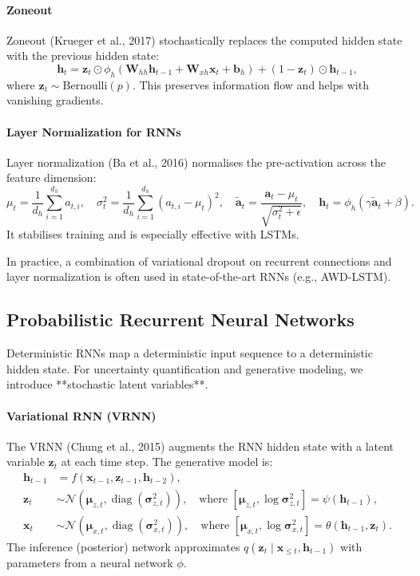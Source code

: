 \documentclass{tufte-handout}
\begin{document}
\paragraph{Zoneout}
Zoneout (Krueger et al., 2017) stochastically replaces the computed hidden state with the previous hidden state:
\[
\mathbf{h}_t = \mathbf{z}_t \odot \phi_h(\mathbf{W}_{hh}\mathbf{h}_{t-1} + \mathbf{W}_{xh}\mathbf{x}_t + \mathbf{b}_h) + (1 - \mathbf{z}_t) \odot \mathbf{h}_{t-1},
\]
where $\mathbf{z}_t \sim \text{Bernoulli}(p)$. This preserves information flow and helps with vanishing gradients.

\paragraph{Layer Normalization for RNNs}
Layer normalization (Ba et al., 2016) normalises the pre-activation across the feature dimension:
\[
\mu_t = \frac{1}{d_h}\sum_{i=1}^{d_h} a_{t,i},\quad \sigma_t^2 = \frac{1}{d_h}\sum_{i=1}^{d_h} (a_{t,i} - \mu_t)^2,\quad \tilde{\mathbf{a}}_t = \frac{\mathbf{a}_t - \mu_t}{\sqrt{\sigma_t^2 + \epsilon}},\quad \mathbf{h}_t = \phi_h(\gamma \tilde{\mathbf{a}}_t + \beta).
\]
It stabilises training and is especially effective with LSTMs.

\begin{remark}
    In practice, a combination of variational dropout on recurrent connections and layer normalization is often used in state-of-the-art RNNs (e.g., AWD-LSTM).
\end{remark}

\subsection{Probabilistic Recurrent Neural Networks}

Deterministic RNNs map a deterministic input sequence to a deterministic hidden state. For uncertainty quantification and generative modeling, we introduce **stochastic latent variables**.

\paragraph{Variational RNN (VRNN)}
The VRNN (Chung et al., 2015) augments the RNN hidden state with a latent variable $\mathbf{z}_t$ at each time step. The generative model is:
\begin{align}
    \mathbf{h}_{t-1} &= f(\mathbf{x}_{t-1}, \mathbf{z}_{t-1}, \mathbf{h}_{t-2}), \\
    \mathbf{z}_t &\sim \mathcal{N}(\boldsymbol{\mu}_{z,t}, \operatorname{diag}(\boldsymbol{\sigma}_{z,t}^2)), \quad \text{where } [\boldsymbol{\mu}_{z,t}, \log \boldsymbol{\sigma}_{z,t}^2] = \psi(\mathbf{h}_{t-1}), \\
    \mathbf{x}_t &\sim \mathcal{N}(\boldsymbol{\mu}_{x,t}, \operatorname{diag}(\boldsymbol{\sigma}_{x,t}^2)), \quad \text{where } [\boldsymbol{\mu}_{x,t}, \log \boldsymbol{\sigma}_{x,t}^2] = \theta(\mathbf{h}_{t-1}, \mathbf{z}_t).
\end{align}
The inference (posterior) network approximates $q(\mathbf{z}_t \mid \mathbf{x}_{\le t}, \mathbf{h}_{t-1})$ with parameters from a neural network $\phi$.
\end{document}
